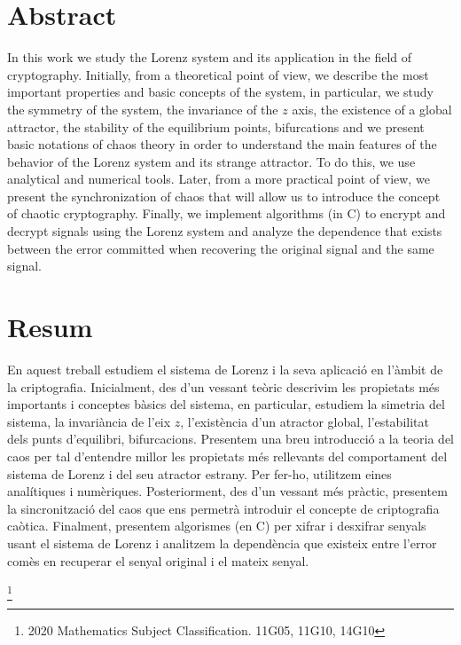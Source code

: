 \documentclass[11pt,a4paper,openright,oneside]{article}
\numberwithin{equation}{section}
\theoremstyle{definition}
\begin{document}
\section*{Abstract}

In this work we study the Lorenz system and its application in the field of cryptography. Initially, from a theoretical point of view, we describe the most important properties and basic concepts of the system, in particular, we study the symmetry of the system, the invariance of the $z$ axis, the existence of a global attractor, the stability of the equilibrium points, bifurcations and we present basic notations of chaos theory in order to understand the main features of the behavior of the Lorenz system and its strange attractor. To do this, we use analytical and numerical tools. Later, from a more practical point of view, we present the synchronization of chaos that will allow us to introduce the concept of chaotic cryptography. Finally, we implement algorithms (in C) to encrypt and decrypt signals using the Lorenz system and analyze the dependence that exists between the error committed when recovering the original signal and the same signal.

\section*{Resum}

En aquest treball estudiem el sistema de Lorenz i la seva aplicació en l'àmbit de la criptografia. Inicialment, des d'un vessant teòric descrivim les propietats més importants i conceptes bàsics del sistema, en particular, estudiem la simetria del sistema, la invariància de l'eix $z$, l'existència d'un atractor global, l'estabilitat dels punts d'equilibri, bifurcacions. Presentem una breu introducció a la teoria del caos per tal d'entendre millor les propietats més rellevants del comportament del sistema de Lorenz i del seu atractor estrany. Per fer-ho, utilitzem eines analítiques i numèriques. Posteriorment, des d'un vessant més pràctic, presentem la sincronització del caos que ens permetrà introduir el concepte de criptografia caòtica. Finalment, presentem algorismes (en C) per xifrar i desxifrar senyals usant el sistema de Lorenz i analitzem la dependència que existeix entre l'error comès en recuperar el senyal original i el mateix senyal.

{\let\thefootnote\relax\footnote{2020 Mathematics Subject Classification. 11G05, 11G10, 14G10}}

\newpage 
\end{document}
